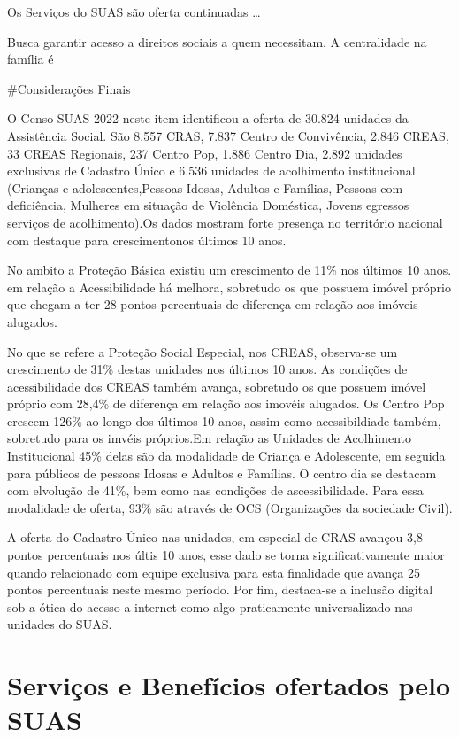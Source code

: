\documentclass[
  brazilian]{report}
\begin{document}
Os Serviços do SUAS são oferta continuadas \ldots{}

Busca garantir acesso a direitos sociais a quem necessitam. A
centralidade na família é 

\#Considerações Finais

O Censo SUAS 2022 neste item identificou a oferta de 30.824 unidades da
Assistência Social. São 8.557 CRAS, 7.837 Centro de Convivência, 2.846
CREAS, 33 CREAS Regionais, 237 Centro Pop, 1.886 Centro Dia, 2.892
unidades exclusivas de Cadastro Único e 6.536 unidades de acolhimento
institucional (Crianças e adolescentes,Pessoas Idosas, Adultos e
Famílias, Pessoas com deficiência, Mulheres em situação de Violência
Doméstica, Jovens egressos serviços de acolhimento).Os dados mostram
forte presença no território nacional com destaque para crescimentonos
últimos 10 anos.

No ambito a Proteção Básica existiu um crescimento de 11\% nos últimos
10 anos. em relação a Acessibilidade há melhora, sobretudo os que
possuem imóvel próprio que chegam a ter 28 pontos percentuais de
diferença em relação aos imóveis alugados.

No que se refere a Proteção Social Especial, nos CREAS, observa-se um
crescimento de 31\% destas unidades nos últimos 10 anos. As condições de
acessibilidade dos CREAS também avança, sobretudo os que possuem imóvel
próprio com 28,4\% de diferença em relação aos imovéis alugados. Os
Centro Pop crescem 126\% ao longo dos últimos 10 anos, assim como
acessibildiade também, sobretudo para os imvéis próprios.Em relação as
Unidades de Acolhimento Institucional 45\% delas são da modalidade de
Criança e Adolescente, em seguida para públicos de pessoas Idosas e
Adultos e Famílias. O centro dia se destacam com elvolução de 41\%, bem
como nas condições de ascessibilidade. Para essa modalidade de oferta,
93\% são através de OCS (Organizações da sociedade Civil).

A oferta do Cadastro Único nas unidades, em especial de CRAS avançou 3,8
pontos percentuais nos últis 10 anos, esse dado se torna
significativamente maior quando relacionado com equipe exclusiva para
esta finalidade que avança 25 pontos percentuais neste mesmo período.
Por fim, destaca-se a inclusão digital sob a ótica do acesso a internet
como algo praticamente universalizado nas unidades do SUAS.

\hypertarget{serviuxe7os-e-benefuxedcios-ofertados-pelo-suas}{%
\chapter{Serviços e Benefícios ofertados pelo
SUAS}\label{serviuxe7os-e-benefuxedcios-ofertados-pelo-suas}}
\end{document}
